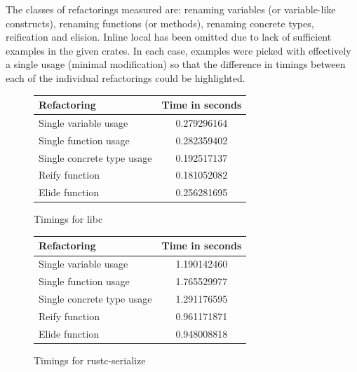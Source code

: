 The classes of refactorings measured are: renaming variables (or variable-like constructs), renaming functions (or methods), renaming concrete types, reification and elision. Inline local has been omitted due to lack of sufficient examples in the given crates. In each case, examples were picked with effectively a single usage (minimal modification) so that the difference in timings between each of the individual refactorings could be highlighted. 

\begin{figure}[H]
\begin{center}
    \begin{tabular}{ | l | c |}
    \hline
    \textbf{Refactoring} & \textbf{Time in seconds} \\ \hline
    Single variable usage & 0.279296164 \\ \hline
    Single function usage &  0.282359402  \\ \hline
    Single concrete type usage  &  0.192517137 \\ \hline
    Reify function &  0.181052082 \\ \hline
    Elide function &  0.256281695 \\ \hline
    \end{tabular}
\end{center}

\caption{Timings for libc}
\label{Fig:libc}
\end{figure}

\begin{figure}[H]
\begin{center}
    \begin{tabular}{ | l | c |}
    \hline
    \textbf{Refactoring} & \textbf{Time in seconds} \\ \hline
    Single variable usage &  1.190142460 \\ \hline
    Single function usage &  1.765529977  \\ \hline
    Single concrete type usage  &  1.291176595 \\ \hline
    Reify function &  0.961171871  \\ \hline
    Elide function &  0.948008818 \\ \hline
    \end{tabular}
\end{center}

\caption{Timings for rustc-serialize}
\label{Fig:rustc-serialize}
\end{figure}

